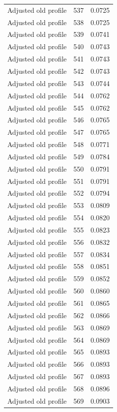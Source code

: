 \begin{table}[htbp]
\begin{tabular}{lll}
Adjusted old profile & 537 & 0.0725 \\
Adjusted old profile & 538 & 0.0725 \\
Adjusted old profile & 539 & 0.0741 \\
Adjusted old profile & 540 & 0.0743 \\
Adjusted old profile & 541 & 0.0743 \\
Adjusted old profile & 542 & 0.0743 \\
Adjusted old profile & 543 & 0.0744 \\
Adjusted old profile & 544 & 0.0762 \\
Adjusted old profile & 545 & 0.0762 \\
Adjusted old profile & 546 & 0.0765 \\
Adjusted old profile & 547 & 0.0765 \\
Adjusted old profile & 548 & 0.0771 \\
Adjusted old profile & 549 & 0.0784 \\
Adjusted old profile & 550 & 0.0791 \\
Adjusted old profile & 551 & 0.0791 \\
Adjusted old profile & 552 & 0.0794 \\
Adjusted old profile & 553 & 0.0809 \\
Adjusted old profile & 554 & 0.0820 \\
Adjusted old profile & 555 & 0.0823 \\
Adjusted old profile & 556 & 0.0832 \\
Adjusted old profile & 557 & 0.0834 \\
Adjusted old profile & 558 & 0.0851 \\
Adjusted old profile & 559 & 0.0852 \\
Adjusted old profile & 560 & 0.0860 \\
Adjusted old profile & 561 & 0.0865 \\
Adjusted old profile & 562 & 0.0866 \\
Adjusted old profile & 563 & 0.0869 \\
Adjusted old profile & 564 & 0.0869 \\
Adjusted old profile & 565 & 0.0893 \\
Adjusted old profile & 566 & 0.0893 \\
Adjusted old profile & 567 & 0.0893 \\
Adjusted old profile & 568 & 0.0896 \\
Adjusted old profile & 569 & 0.0903 \\

\end{tabular}
\end{table}
